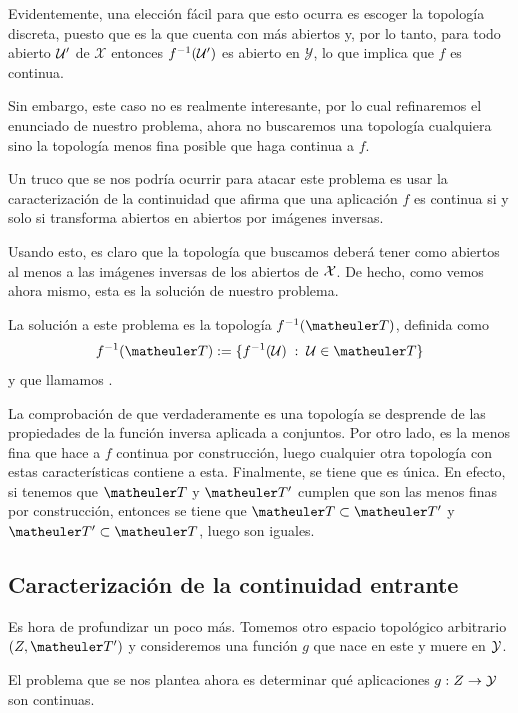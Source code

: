 \begin{obs}
	Evidentemente, una elección fácil para que esto ocurra es escoger la topología discreta, puesto que es la que cuenta con más abiertos y, por lo tanto, para todo abierto $\mathcal{U}'$ de $\mathcal{X}$ entonces $f^{-1}(\mathcal{U}')$ es abierto en $\mathcal{Y}$, lo que implica que $f$ es continua.
\end{obs}
Sin embargo, este caso no es realmente interesante, por lo cual refinaremos el enunciado de nuestro problema, ahora no buscaremos una topología cualquiera sino la topología menos fina posible que haga continua a $f$.
\begin{obs}
	Un truco que se nos podría ocurrir para atacar este problema es usar la caracterización de la continuidad que afirma que una aplicación $f$ es continua si y solo si transforma abiertos en abiertos por imágenes inversas.
	
	Usando esto, es claro que la topología que buscamos deberá tener como abiertos al menos a las imágenes inversas de los abiertos de $\mathcal{X}$. De hecho, como vemos ahora mismo, esta es la solución de nuestro problema.
\end{obs}
La solución a este problema es la topología $f^{-1}(\T)$, definida como 
\[f^{-1}(\T):=\{f^{-1}(\U)\midc\U\in \T\}\]
y que llamamos .

La comprobación de que verdaderamente es una topología se desprende de las propiedades de la función inversa aplicada a conjuntos. Por otro lado, es la menos fina que hace a $f$ continua por construcción, luego cualquier otra topología con estas características contiene a esta. Finalmente, se tiene que es única. En efecto, si tenemos que $\T$ y $\T'$ cumplen que son las menos finas por construcción, entonces se tiene que $\T\subset \T'$ y $\T'\subset \T$, luego son iguales.

\subsection{Caracterización de la continuidad entrante}
Es hora de profundizar un poco más. Tomemos otro espacio topológico arbitrario $(Z,\T')$ y consideremos una función $g$ que nace en este y muere en $\mathcal{Y}$.

El problema que se nos plantea ahora es determinar qué aplicaciones $g:Z\to \mathcal{Y}$ son continuas.

